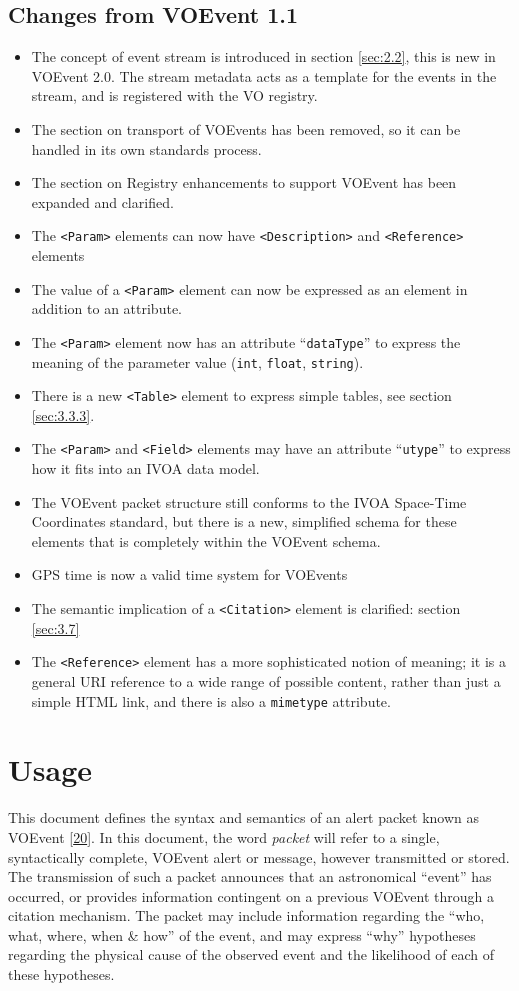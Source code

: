 \documentclass[11pt,a4paper]{ivoa}
\begin{document}
\subsection{Changes from VOEvent 1.1}
\begin{itemize}
\item The concept of event stream is introduced in section \ref{sec:2.2}, this is new in VOEvent 2.0. The stream metadata acts as a template for the events in the stream, and is registered with the VO registry. 
\item The section on transport of VOEvents has been removed, so it can be handled in its own standards process. 
\item The section on Registry enhancements to support VOEvent has been expanded and clarified. 
\item The {\tt <Param>} elements can now have {\tt <Description>} and {\tt <Reference>} elements 
\item The value of a {\tt <Param>} element can now be expressed as an element in addition to an attribute. 
\item The {\tt <Param>} element now has an attribute ``{\tt dataType}'' to express the meaning of the parameter value ({\tt int}, {\tt float}, {\tt string}). 
\item There is a new {\tt <Table>} element to express simple tables, see section \ref{sec:3.3.3}. 
\item The {\tt <Param>} and {\tt <Field>} elements may have an attribute ``{\tt utype}'' to express how it fits into an IVOA data model. 
\item The VOEvent packet structure still conforms to the IVOA Space-Time Coordinates standard, but there is a new, simplified schema for these elements that is completely within the VOEvent schema. 
\item GPS time is now a valid time system for VOEvents 
\item The semantic implication of a {\tt <Citation>} element is clarified: section \ref{sec:3.7} 
\item The {\tt <Reference>} element has a more sophisticated notion of meaning; it is a general URI reference to a wide range of possible content, rather than just a simple HTML link, and there is also a {\tt mimetype} attribute. 
\end{itemize}

\section{Usage}
\label{sec:2}
This document defines the syntax and semantics of an alert packet known as VOEvent [\hyperref[bib20]{20}]. In this document, the word \emph{packet} will refer to a single, syntactically complete, VOEvent alert or message, however transmitted or stored. The transmission of such a packet announces that an astronomical ``event'' has occurred, or provides information contingent on a previous VOEvent through a citation mechanism. The packet may include information regarding the ``who, what, where, when \& how'' of the event, and may express ``why'' hypotheses regarding the physical cause of the observed event and the likelihood of each of these hypotheses. 
\end{document}

